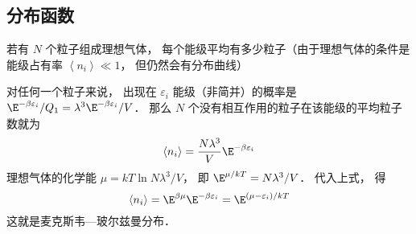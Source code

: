 \subsection{分布函数}
若有 $N$ 个粒子组成理想气体， 每个能级平均有多少粒子（由于理想气体的条件是能级占有率 $\left\langle {{n_i}} \right\rangle \ll 1$，  但仍然会有分布曲线）

对任何一个粒子来说， 出现在 ${\varepsilon _i}$ 能级（非简并）的概率是 ${{{\E^{ - \beta {\varepsilon _i}}}}}/{{{Q_1}}} = {{{\lambda ^3}}}{\E^{ - \beta {\varepsilon _i}}}/{V}$．  那么 $N$ 个没有相互作用的粒子在该能级的平均粒子数就为
\begin{equation}
\left\langle {{n_i}} \right\rangle  = \frac{{N{\lambda ^3}}}{V}{\E^{ - \beta {\varepsilon _i}}}
\end{equation}
理想气体的化学能 $\mu  = kT\ln {{N{\lambda ^3}}}/{V}$，  即 ${\E^{\mu/kT}} = {{N{\lambda ^3}}}/{V}$．  代入上式， 得
\begin{equation}
\left\langle {{n_i}} \right\rangle  = {\E^{\beta \mu }}{\E^{ - \beta {\varepsilon _i}}} = {\E^{(\mu - \varepsilon_i)/kT}}
\end{equation}
这就是麦克斯韦—玻尔兹曼分布．


